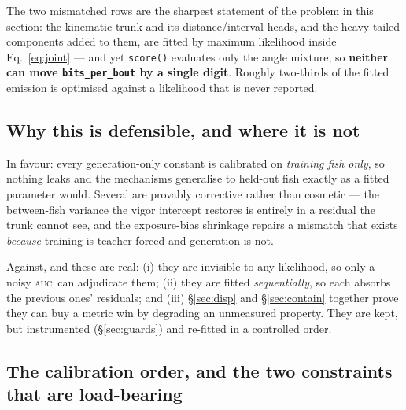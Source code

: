 \documentclass[11pt,a4paper]{article}
\newcommand{\auc}{\textsc{auc}}
\newcommand{\code}[1]{\texttt{\small #1}}
\begin{document}
\noindent\small
The two mismatched rows are the sharpest statement of the problem in this section: the
kinematic trunk and its distance/interval heads, and the heavy-tailed components added to
them, are fitted by maximum likelihood inside Eq.~\eqref{eq:joint} --- and yet
\code{score()} evaluates only the angle mixture, so \textbf{neither can move
\code{bits\_per\_bout} by a single digit}. Roughly two-thirds of the fitted emission is
optimised against a likelihood that is never reported.\normalsize

\subsection{Why this is defensible, and where it is not}

In favour: every generation-only constant is calibrated on \emph{training fish only}, so
nothing leaks and the mechanisms generalise to held-out fish exactly as a fitted parameter
would. Several are provably corrective rather than cosmetic --- the between-fish variance
the vigor intercept restores is entirely in a residual the trunk cannot see, and the
exposure-bias shrinkage repairs a mismatch that exists \emph{because} training is
teacher-forced and generation is not.

Against, and these are real: (i) they are invisible to any likelihood, so only a noisy
\auc\ can adjudicate them; (ii) they are fitted \emph{sequentially}, so each absorbs the
previous ones' residuals; and (iii) \S\ref{sec:disp} and \S\ref{sec:contain} together
prove they can buy a metric win by degrading an unmeasured property. They are kept, but
instrumented (\S\ref{sec:guards}) and re-fitted in a controlled order.

\subsection{The calibration order, and the two constraints that are load-bearing}
\end{document}
